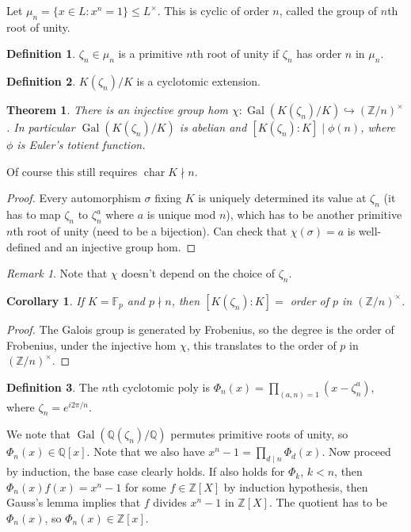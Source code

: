 \documentclass{article}
\theoremstyle{definition}
\newtheorem*{defn*}{Definition}
\theoremstyle{remark}
\newtheorem{rem}{Remark}
\theoremstyle{plain}
\newtheorem{thm}[defn]{Theorem}
\newtheorem{crly}[defn]{Corollary}
\newcommand{\ZZ}{\mathbb{Z}}
\newcommand{\QQ}{\mathbb{Q}}
\newcommand{\FF}{\mathbb{F}}
\newcommand{\Gal}{\operatorname{Gal}}
\begin{document}
Let $\mu_n=\{x\in L:x^n=1\}\le L^\times$. This is cyclic of order $n$, called the group of $n$th root of unity.
\begin{defn*}
    $\zeta_n\in\mu_n$ is a primitive $n$th root of unity if $\zeta_n$ has order $n$ in $\mu_n$.
\end{defn*}

\begin{defn*}
    $K(\zeta_n)/K$ is a cyclotomic extension.
\end{defn*}
\begin{thm}
    There is an injective group hom $\chi:\Gal(K(\zeta_n)/K)\hookrightarrow (\ZZ/n)^\times$. In particular $\Gal(K(\zeta_n)/K)$ is abelian and $[K(\zeta_n):K]\mid \phi(n)$, where $\phi$ is Euler's totient function.
\end{thm}
Of course this still requires $\operatorname{char}K\nmid  n$.
\begin{proof}
    Every automorphism $\sigma$ fixing $K$ is uniquely determined its value at $\zeta_n$ (it has to map $\zeta_n$ to $\zeta_n^a$ where $a$ is unique mod $n$), which has to be another primitive $n$th root of unity (need to be a bijection). Can check that $\chi(\sigma)=a$ is well-defined and an injective group hom.
\end{proof}
\begin{rem}
    Note that $\chi$ doesn't depend on the choice of $\zeta_n$.
\end{rem}
\begin{crly}
    If $K=\FF_p$ and $p\nmid n$, then $[K(\zeta_n):K]=$ order of $p$ in $(\ZZ/n)^\times$.
\end{crly}
\begin{proof}
    The Galois group is generated by Frobenius, so the degree is the order of Frobenius, under the injective hom $\chi$, this translates to the order of $p$ in $(\ZZ/n)^\times$.
\end{proof}
\begin{defn*}
    The $n$th cyclotomic poly is $\Phi_n(x)=\prod_{(a,n)=1}(x-\zeta_n^a)$, where $\zeta_n=e^{i2\pi /n}$.
\end{defn*}
We note that $\Gal(\QQ(\zeta_n)/\QQ)$ permutes primitive roots of unity, so $\Phi_n(x)\in\QQ[x]$. Note that we also have $x^n-1=\prod_{d\mid n}\Phi_d(x)$. Now proceed by induction, the base case clearly holds. If also holds for $\Phi_k$, $k<n$, then $\Phi_n(x)f(x)=x^n-1$ for some $f\in \ZZ[X]$ by induction hypothesis, then Gauss's lemma implies that $f$ divides $x^n-1$ in $\ZZ[X]$. The quotient has to be $\Phi_n(x)$, so $\Phi_n(x)\in\ZZ[x]$.
\end{document}
